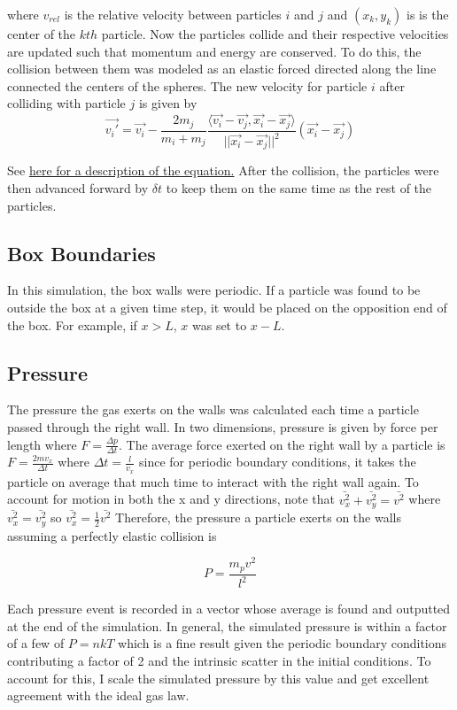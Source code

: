 \documentclass[12pt]{amsart}
\begin{document}
where $v_{rel}$ is the relative velocity between particles $i$ and $j$ and $(x_k,y_k)$ is is the center of the $kth$ particle.  Now the particles collide and their respective velocities are updated such that momentum and energy are conserved.  To do this, the collision between them was modeled as an elastic forced directed along the line connected the centers of the spheres.  The new velocity for particle $i$ after colliding with particle $j$ is given by
$$ \vec{v_i'} = \vec{v_i} - \frac{2 m_j}{m_i + m_j} \frac{\langle \vec{v_i} - \vec{v_j}, \vec{x_i} - \vec{x_j}{ \rangle}}{||\vec{x_i} - \vec{x_j}||^2} (\vec{x_i} - \vec{x_j}) $$
  
 See \href{https://en.wikipedia.org/wiki/Elastic_collision#Two-dimensional_collision_with_two_moving_objects}{here for a description of the equation.}   After the collision, the particles were then advanced forward by $\delta t$ to keep them on the same time as the rest of the particles.
 
\subsection{Box Boundaries}

In this simulation, the box walls were periodic.  If a particle was found to be outside the box at a given time step, it would be placed on the opposition end of the box.  For example, if $x > L$, $x$ was set to $x - L$.  

\subsection{Pressure}

The pressure the gas exerts on the walls was calculated each time a particle passed through the right wall.  In two dimensions, pressure is given by force per length where $F = \frac{\Delta p}{\Delta t}$.  The average force exerted on the right wall by a particle is $F = \frac{2 m v_x}{\Delta t}$ where $\Delta t = \frac{l}{v_x}$ since for periodic boundary conditions, it takes the particle on average that much time to interact with the right wall again.  To account for motion in both the x and y directions, note that $\bar{v_x^2} + \bar{v_y^2} = \bar{v^2}$ where $\bar{v_x^2} = \bar{v_y^2}$ so $\bar{v_x^2} = \frac{1}{2} \bar{v^2}$ Therefore, the pressure a particle exerts on the walls assuming a perfectly elastic collision is

$$ P =  \frac{m_p v^2}{l^2}   $$

Each pressure event is recorded in a vector whose average is found and outputted at the end of the simulation.  In general, the simulated pressure is within a factor of a few of $P = nkT$ which is a fine result given the periodic boundary conditions contributing a factor of 2 and the intrinsic scatter in the initial conditions.  To account for this, I scale the simulated pressure by this value and get excellent agreement with the ideal gas law.
\end{document}

